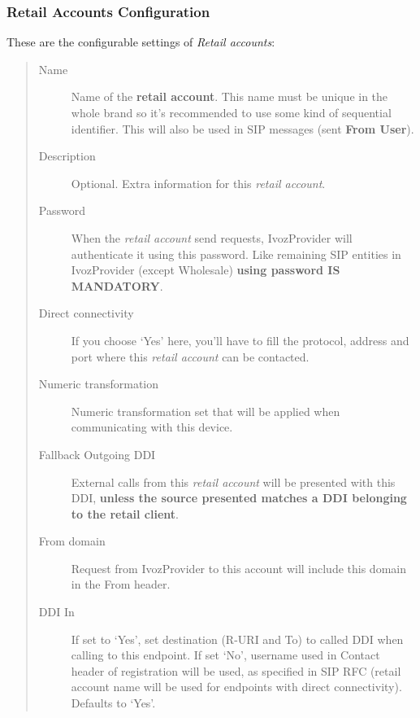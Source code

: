 \documentclass[letterpaper,10pt,spanish]{sphinxmanual}
\begin{document}
\subsubsection{Retail Accounts Configuration}
\label{administration_portal/client/retail/retail_accounts:retail-accounts-configuration}
These are the configurable settings of \emph{Retail accounts}:
\begin{quote}
\begin{description}
\item[{Name}] \leavevmode
Name of the \textbf{retail account}. This name must be unique in the whole brand so
it's recommended to use some kind of sequential identifier. This will also be used
in SIP messages (sent \textbf{From User}).

\item[{Description}] \leavevmode
Optional. Extra information for this \emph{retail account}.

\item[{Password}] \leavevmode
When the \emph{retail account} send requests, IvozProvider will authenticate it using
this password. Like remaining SIP entities in IvozProvider (except Wholesale) \textbf{using password IS MANDATORY}.

\item[{Direct connectivity}] \leavevmode
If you choose `Yes' here, you'll have to fill the protocol, address and
port where this \emph{retail account} can be contacted.

\item[{Numeric transformation}] \leavevmode
Numeric transformation set that will be applied when communicating with this device.

\item[{Fallback Outgoing DDI}] \leavevmode
External calls from this \emph{retail account} will be presented with this DDI, \textbf{unless
the source presented matches a DDI belonging to the retail client}.

\item[{From domain}] \leavevmode
Request from IvozProvider to this account will include this domain in
the From header.

\item[{DDI In}] \leavevmode
If set to `Yes', set destination (R-URI and To) to called DDI when calling to this endpoint. If set `No', username
used in Contact header of registration will be used, as specified in SIP RFC (retail account name will be used for
endpoints with direct connectivity). Defaults to `Yes'.


\end{description}
\end{quote}
\end{document}
